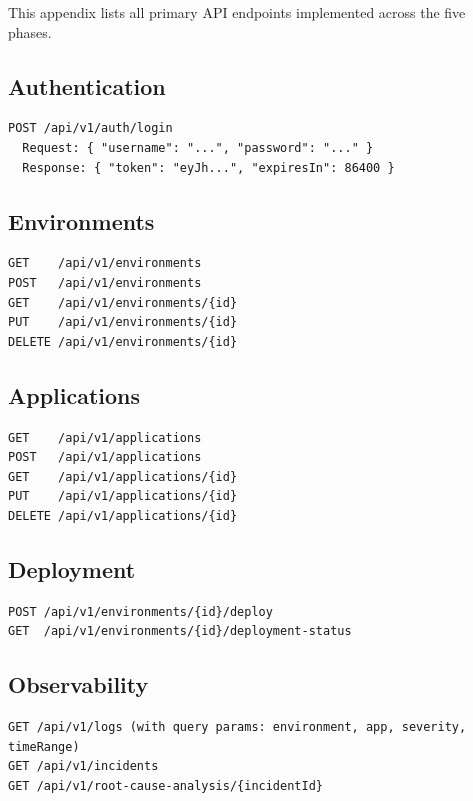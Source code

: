 \documentclass[12pt,a4paper]{report}
\begin{document}
This appendix lists all primary API endpoints implemented across the five phases.

\subsection{Authentication}

\begin{verbatim}
POST /api/v1/auth/login
  Request: { "username": "...", "password": "..." }
  Response: { "token": "eyJh...", "expiresIn": 86400 }
\end{verbatim}

\subsection{Environments}

\begin{verbatim}
GET    /api/v1/environments
POST   /api/v1/environments
GET    /api/v1/environments/{id}
PUT    /api/v1/environments/{id}
DELETE /api/v1/environments/{id}
\end{verbatim}

\subsection{Applications}

\begin{verbatim}
GET    /api/v1/applications
POST   /api/v1/applications
GET    /api/v1/applications/{id}
PUT    /api/v1/applications/{id}
DELETE /api/v1/applications/{id}
\end{verbatim}

\subsection{Deployment}

\begin{verbatim}
POST /api/v1/environments/{id}/deploy
GET  /api/v1/environments/{id}/deployment-status
\end{verbatim}

\subsection{Observability}

\begin{verbatim}
GET /api/v1/logs (with query params: environment, app, severity, timeRange)
GET /api/v1/incidents
GET /api/v1/root-cause-analysis/{incidentId}
\end{verbatim}
\end{document}
